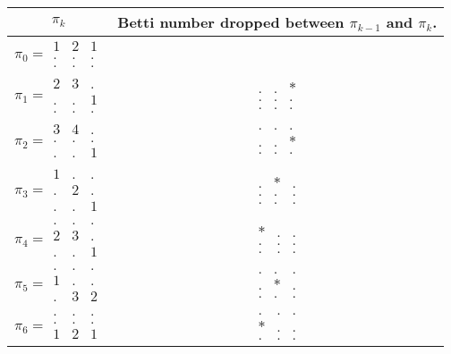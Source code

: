 \documentclass[12pt]{amsart}
\theoremstyle{plain}
\theoremstyle{definition}
\theoremstyle{remark}
\begin{document}
\begin{tabular}{c|c}
$\pi_{k}$&Betti number dropped between $\pi_{k-1}$ and
$\pi_{k}$.\\\hline
$\pi_{0}=\begin{array}{ccc}1&2&1\\.&.&.\\.&.&.\end{array}$&\\\hline
$\pi_1=\begin{array}{ccc}2&3&.\\.&.&1\\.&.&.\end{array}$&$\begin{array}{ccc}.&.&*\\.&.&.\\.&.&.\end{array}$\\\hline
$\pi_{2}=\begin{array}{ccc}3&4&.\\.&.&.\\.&.&1\end{array}$&$\begin{array}{ccc}.&.&.\\.&.&*\\.&.&.\end{array}$\\\hline
$\pi_3=\begin{array}{ccc}1&.&.\\.&2&.\\.&.&1\end{array}$&$\begin{array}{ccc}.&*&.\\.&.&.\\.&.&.\end{array}$\\\hline
$\pi_4=\begin{array}{ccc}.&.&.\\2&3&.\\.&.&1\end{array}$&$\begin{array}{ccc}*&.&.\\.&.&.\\.&.&.\end{array}$\\\hline
$\pi_5=\begin{array}{ccc}.&.&.\\1&.&.\\.&3&2\end{array}$&$\begin{array}{ccc}.&.&.\\.&*&.\\.&.&.\end{array}$\\\hline
$\pi_6=\begin{array}{ccc}.&.&.\\.&.&.\\1&2&1\end{array}$&$\begin{array}{ccc}.&.&.\\{}*&.&.\\.&.&.\end{array}$\end{tabular}
\end{document}
